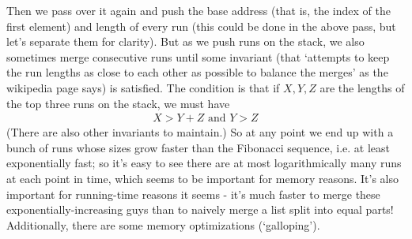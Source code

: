 \documentclass{article}
\begin{document}
\begin{itemize}
    Then we pass over it again and push the base address (that is, the index of
    the first element) and length of every run (this could be done in the above
    pass, but let's separate them for clarity).
    But as we push runs on the stack,
    we also sometimes merge consecutive runs until some invariant
    (that `attempts
    to keep the run lengths as close to each other as possible to balance the
    merges' as the wikipedia page says) is satisfied.
    The condition is that if
    $X,Y,Z$ are the lengths of the top three runs on the stack, we must have
	  \begin{align*}
	  X > Y + Z \text{ and } Y >Z
    \end{align*}
    (There are also other invariants to maintain.)
	  So at any point we end up with a bunch of runs whose sizes grow
    faster than the Fibonacci sequence, i.e. at least exponentially fast; so
    it's easy to see there are at most logarithmically
    many runs at each point in
    time, which seems to be important for memory reasons.
    It's also important for
    running-time reasons it seems - it's much faster to merge these
    exponentially-increasing guys than to naively merge a list split into
    equal parts!
	  Additionally, there are some memory optimizations (`galloping').
\end{itemize}
\end{document}
